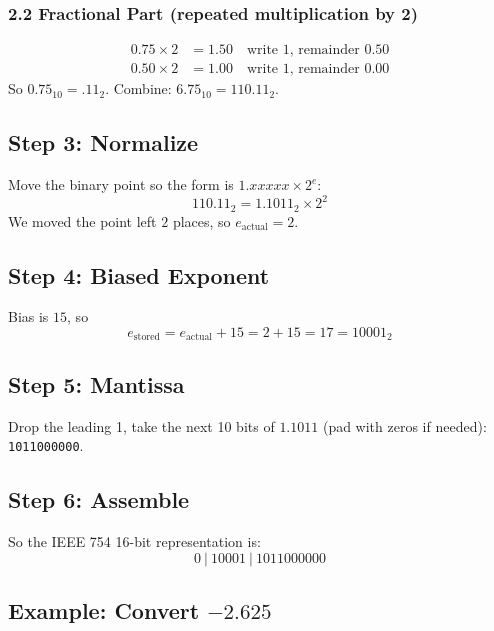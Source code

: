 \documentclass[12pt]{article}
\begin{document}
\subsubsection*{2.2 Fractional Part (repeated multiplication by 2)}
\begin{align*}
0.75 \times 2 &= 1.50 \quad\text{write 1, remainder }0.50 \\
0.50 \times 2 &= 1.00 \quad\text{write 1, remainder }0.00
\end{align*}
So $0.75_{10} = .11_2$. Combine: $6.75_{10} = 110.11_2$.

\subsection*{Step 3: Normalize}
Move the binary point so the form is $1.xxxxx \times 2^e$:
\[
110.11_2 = 1.1011_2 \times 2^{2}
\]
We moved the point left $2$ places, so $e_{\text{actual}} = 2$.

\subsection*{Step 4: Biased Exponent}
Bias is $15$, so
\[
e_{\text{stored}} = e_{\text{actual}} + 15 = 2 + 15 = 17 = 10001_2
\]

\subsection*{Step 5: Mantissa}
Drop the leading 1, take the next 10 bits of $1.1011$ (pad with zeros if needed): \texttt{1011000000}.

\subsection*{Step 6: Assemble}
So the IEEE 754 16-bit representation is:
\[
0\ |\ 10001\ |\ 1011000000
\]

\subsection*{Example: Convert $-2.625$}
\end{document}
